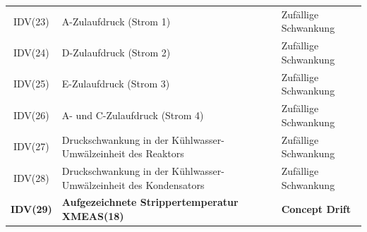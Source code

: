 \begin{table}[htbp]
\begin{tabular}{cll}
IDV(23) & A-Zulaufdruck (Strom 1) & Zufällige Schwankung \\
IDV(24) & D-Zulaufdruck (Strom 2) & Zufällige Schwankung \\
IDV(25) & E-Zulaufdruck (Strom 3) & Zufällige Schwankung \\
IDV(26) & A- und C-Zulaufdruck (Strom 4) & Zufällige Schwankung \\
IDV(27) & Druckschwankung in der Kühlwasser-Umwälzeinheit des Reaktors & Zufällige Schwankung \\
IDV(28) & Druckschwankung in der Kühlwasser-Umwälzeinheit des Kondensators & Zufällige Schwankung \\
\textbf{IDV(29)} & \textbf{Aufgezeichnete Strippertemperatur XMEAS(18)} & \textbf{Concept Drift} \\
\bottomrule
\end{tabular}
\end{table}

